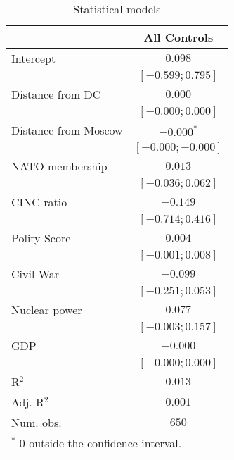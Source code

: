 
\begin{table}
\begin{center}
\begin{tabular}{l c}
\hline
 & All Controls \\
\hline
Intercept            & $0.098$             \\
                     & $ [-0.599;  0.795]$ \\
Distance from DC     & $0.000$             \\
                     & $ [-0.000;  0.000]$ \\
Distance from Moscow & $-0.000^{*}$        \\
                     & $ [-0.000; -0.000]$ \\
NATO membership      & $0.013$             \\
                     & $ [-0.036;  0.062]$ \\
CINC ratio           & $-0.149$            \\
                     & $ [-0.714;  0.416]$ \\
Polity Score         & $0.004$             \\
                     & $ [-0.001;  0.008]$ \\
Civil War            & $-0.099$            \\
                     & $ [-0.251;  0.053]$ \\
Nuclear power        & $0.077$             \\
                     & $ [-0.003;  0.157]$ \\
GDP                  & $-0.000$            \\
                     & $ [-0.000;  0.000]$ \\
\hline
R$^2$                & $0.013$             \\
Adj. R$^2$           & $0.001$             \\
Num. obs.            & $650$               \\
\hline
\multicolumn{2}{l}{\scriptsize{$^*$ 0 outside the confidence interval.}}
\end{tabular}
\caption{Statistical models}
\label{table:coefficients}
\end{center}
\end{table}

